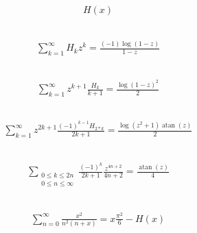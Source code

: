 \documentclass[12pt]{article}
\begin{document}
\subsection{}
\begin{align*}
H{\left(x \right)}
\end{align*}
\vspace{1cm}
\subsection{}
\begin{align*}
\sum_{k=1}^{\infty} H_{k} z^{k} = \frac{\left(-1\right) \log{\left(1 - z \right)}}{1 - z}
\end{align*}
\vspace{1cm}
\subsection{}
\begin{align*}
\sum_{k=1}^{\infty} z^{k + 1} \frac{H_{k}}{k + 1} = \frac{\log{\left(1 - z \right)}^{2}}{2}
\end{align*}
\vspace{1cm}
\subsection{}
\begin{align*}
\sum_{k=1}^{\infty} z^{2 k + 1} \frac{\left(-1\right)^{k - 1} H_{2*k}}{2 k + 1} = \frac{\log{\left(z^{2} + 1 \right)} \operatorname{atan}{\left(z \right)}}{2}
\end{align*}
\vspace{1cm}
\subsection{}
\begin{align*}
\sum_{\substack{0 \leq k \leq 2 n\\0 \leq n \leq \infty}} \frac{\left(-1\right)^{k}}{2 k + 1} \frac{z^{4 n + 2}}{4 n + 2} = \frac{\operatorname{atan}{\left(z \right)}}{4}
\end{align*}
\vspace{1cm}
\subsection{}
\begin{align*}
\sum_{n=0}^{\infty} \frac{x^{2}}{n^{2} \left(n + x\right)} = x \frac{\pi^{2}}{6} - H{\left(x \right)}
\end{align*}
\vspace{1cm}
\end{document}

